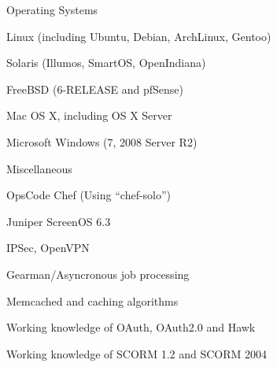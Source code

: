 \documentclass[margin,line]{resume}
\begin{document}
\begin{resume}
	Operating Systems
	\begin{list2}
		\vspace*{1mm}
		\item Linux (including Ubuntu, Debian, ArchLinux, Gentoo)
		\item Solaris (Illumos, SmartOS, OpenIndiana)
		\item FreeBSD (6-RELEASE and pfSense)
		\item Mac OS X, including OS X Server
		\item Microsoft Windows (7, 2008 Server R2)
	\end{list2}

	Miscellaneous
	\begin{list2}
		\item OpsCode Chef (Using ``chef-solo'')
		\item Juniper ScreenOS 6.3
		\item IPSec, OpenVPN
		\item Gearman/Asyncronous job processing
		\item Memcached and caching algorithms
		\item Working knowledge of OAuth, OAuth2.0 and Hawk
		\item Working knowledge of SCORM 1.2 and SCORM 2004
	\end{list2}
\newpage



\end{resume}
\end{document}
